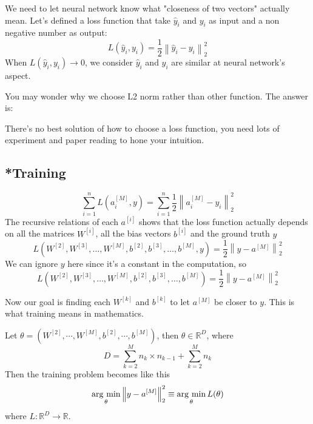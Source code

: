 \documentclass[../main.tex]{subfiles}
\begin{document}
            We need to let neural network know what "closeness of two vectors" actually mean. Let's defined a loss function that take $\hat{y}_i$ and $y_i$ as input and a non negative number as output:
            \[
                L(\hat{y}_i, y_i)=\frac{1}{2}\left\|\hat{y}_i - y_i\right\|_2^2
            \]
            When $L(\hat{y}_i,y_i) \rightarrow 0$, we consider $\hat{y}_i$ and $y_i$ are similar at neural network's aspect.
            
            You may wonder why we choose L2 norm rather than other function. The answer is:
            \begin{displayquote}
                There's no best solution of how to choose a loss function, you need lots of experiment and paper reading to hone your intuition.
            \end{displayquote}
            
        \subsection{*Training}
            \[
                \sum_{i=1}^nL(a_i^{[M]}, y)=\sum_{i=1}^n\frac{1}{2}\left\|a_i^{[M]} - y_i\right\|_2^2
            \]
            The recursive relations of each $a^{[i]}$ shows that the loss function actually depends on all the matrices $W^{[i]}$, all the bias vectors $b^{[i]}$ and the ground truth $y$
            \[
                L(W^{ [2] }, W^{ [3] },\dots,W^{[M]},b^{[2]},b^{[3]},\dots,b^{[M]}, y)=\frac{1}{2}\left\|y-a^{[M]}\right\|_2^2
            \]
            We can ignore $y$ here since it's a constant in the computation, so
            \[
                L(W^{ [2] }, W^{ [3] },\dots,W^{[M]},b^{[2]},b^{[3]},\dots,b^{[M]})=\frac{1}{2}\left\|y-a^{[M]}\right\|_2^2
            \]
            
            Now our goal is finding each  $W^{[k]}$ and $b^{[k]}$ to let $a^{[M]}$ be closer to $y$.
            This is what training means in mathematics.
 
            Let $\theta=(W^{[2]},\cdots,W^{[M]},b^{[2]},\cdots,b^{[M]})$, then $\theta\in\mathbb{R}^D$, where
            \[
                D = \sum_{k=2}^M n_k\times n_{k-1}+\sum_{k=2}^M n_k
            \]
            Then the training problem becomes like this
            \[
                \operatorname*{arg~min}_\theta \left\|y - a^{[M]}\right\|_2^2\equiv\operatorname*{arg~min}_\theta L(\theta)
            \]
            where $L:\mathbb{R}^D \rightarrow \mathbb{R}$. 
\end{document}
